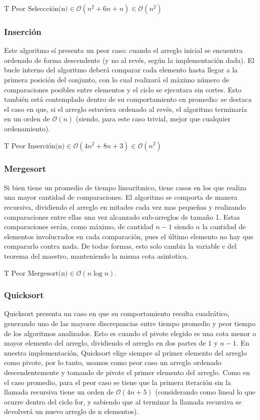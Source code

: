 \documentclass[article,a4paper]{article}
\newcommand{\bigO}{\mathcal{O}}
\begin{document}
$\mbox{T Peor Seleccción(n)} \in \bigO(n^2 + 6n + n) \in \bigO(n^2)$


\subsubsection{Inserción}

Este algoritmo sí presenta un peor caso: cuando el arreglo inicial se encuentra ordenado de forma descendente (y no al revés, según la implementación dada). El bucle interno del algoritmo deberá comparar cada elemento hasta llegar a la primera posición del conjunto, con lo cual realizará el máximo número de comparaciones posibles entre elementos y el ciclo se ejecutara sin cortes. Esto también está contemplado dentro de su comportamiento en promedio: se destaca el caso en que, si el arreglo estuviera ordenado al revés, el algoritmo terminaría en un orden de $\bigO(n)$ (siendo, para este caso trivial, mejor que cualquier ordenamiento).

$\mbox{T Peor Inserción(n)} \in \bigO(4n^2 + 8n + 3) \in \bigO(n^2)$

\subsubsection{Mergesort}

Si bien tiene un promedio de tiempo linearítmico, tiene casos en los que realiza una mayor cantidad de comparaciones. El algoritmo se comporta de manera recursiva, dividiendo el arreglo en mitades cada vez mas pequeñas y realizando comparaciones entre ellas una vez alcanzado sub-arreglos de tamaño 1. Estas comparaciones serán, como máximo, de cantidad $n-1$ siendo $n$ la cantidad de elementos involucrados en cada comparación, pues el último elemento no hay que compararlo contra nada. De todas formas,  esto solo cambia la variable c del teorema del maestro, manteniendo la misma cota asintotica.

$\mbox{T Peor Mergesort(n)} \in \bigO(n \log n)$.

\subsubsection{Quicksort}

Quicksort presenta un caso en que su comportamiento resulta cuadrático, generando uno de las mayores discrepancias entre tiempo promedio y peor tiempo de los algoritmos analizados. Esto es cuando el pivote elegido es una cota menor o mayor elemento del arreglo, dividiendo el arreglo en dos partes de $1$ y $n-1$. En nuestra implementación, Quicksort elige siempre al primer elemento del arreglo como pivote, por lo tanto, usamos como peor caso un arreglo ordenado descendentemente y tomando de pivote el primer elemento del arreglo. Como en el caso promedio, para el peor caso se tiene que la primera iteración sin la llamada recursiva tiene un orden de $\bigO(4n + 5)$ (considerando como lineal lo que ocurre dentro del ciclo for, y sabiendo que al terminar la llamada recursiva se devolverá un nuevo arreglo de n elementos).
\end{document}
